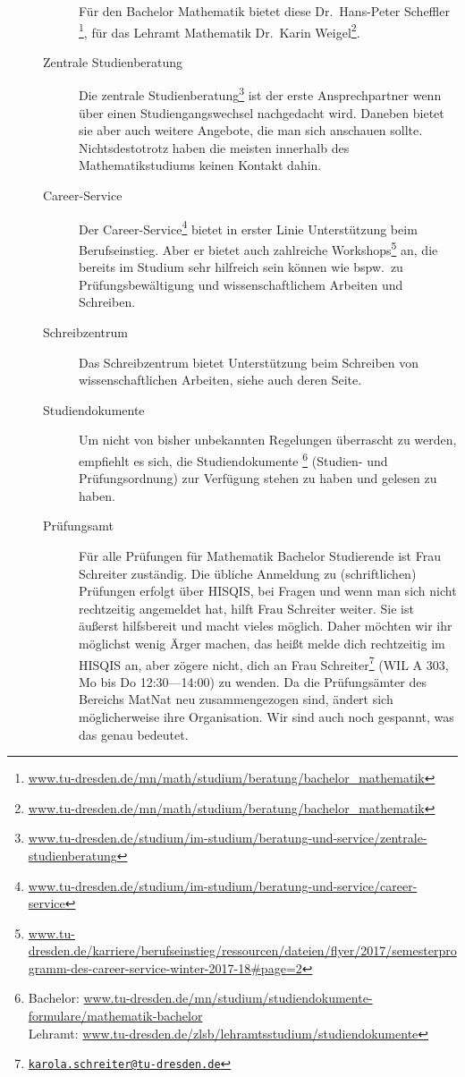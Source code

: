 \documentclass{scrartcl}
\begin{document}
\begin{description}
\begin{description}
    Für den Bachelor Mathematik bietet diese Dr.\ Hans-Peter Scheffler%
    \footnote{\url{www.tu-dresden.de/mn/math/studium/beratung/bachelor_mathematik}}, für das Lehramt Mathematik Dr.\ Karin Weigel\footnote{\url{www.tu-dresden.de/mn/math/studium/beratung/bachelor_mathematik}}.
  \item[Zentrale Studienberatung] Die zentrale Studienberatung\footnote{\url{www.tu-dresden.de/studium/im-studium/beratung-und-service/zentrale-studienberatung}} ist der erste Ansprechpartner wenn über einen Studiengangswechsel nachgedacht wird. Daneben bietet sie aber auch weitere Angebote,
    die man sich anschauen sollte.
    Nichtsdestotrotz haben die meisten innerhalb des Mathematikstudiums keinen Kontakt dahin.
  \item[Career-Service] Der Career-Service\footnote{\url{www.tu-dresden.de/studium/im-studium/beratung-und-service/career-service}} bietet in erster Linie Unterstützung beim Berufseinstieg.
    Aber er bietet auch zahlreiche Workshops\footnote{\url{www.tu-dresden.de/karriere/berufseinstieg/ressourcen/dateien/flyer/2017/semesterprogramm-des-career-service-winter-2017-18\#page=2}} an, die bereits im Studium
    sehr hilfreich sein können wie bspw.\ zu Prüfungsbewältigung und
    wissenschaftlichem Arbeiten und Schreiben.
  \item[Schreibzentrum] Das Schreibzentrum bietet Unterstützung beim Schreiben von wissenschaftlichen Arbeiten, siehe auch deren Seite.
  \item[Studiendokumente] Um nicht von bisher unbekannten Regelungen
    überrascht zu werden, empfiehlt es sich, die Studiendokumente
    \footnote{Bachelor: \url{www.tu-dresden.de/mn/studium/studiendokumente-formulare/mathematik-bachelor}\\
    Lehramt: \url{www.tu-dresden.de/zlsb/lehramtsstudium/studiendokumente}}
    (Studien- und Prüfungsordnung) zur Verfügung stehen zu haben und
    gelesen zu haben.
  \item[Prüfungsamt] Für alle Prüfungen für Mathematik Bachelor Studierende ist
    Frau Schreiter zuständig.
    Die übliche Anmeldung zu (schriftlichen) Prüfungen erfolgt über HISQIS,
    bei Fragen und wenn man sich nicht rechtzeitig angemeldet hat, hilft Frau Schreiter weiter.
    Sie ist äußerst hilfsbereit und macht vieles möglich.
    Daher möchten wir ihr möglichst wenig Ärger machen, das heißt melde dich rechtzeitig im HISQIS an,
    aber zögere nicht,
    dich an Frau Schreiter\footnote{\href{mailto:karola.schreiter@tu-dresden.de}
    {\nolinkurl{karola.schreiter@tu-dresden.de}}} (WIL A 303, Mo bis Do 12:30---14:00) zu wenden.
    Da die Prüfungsämter des Bereichs MatNat neu zusammengezogen sind, ändert sich möglicherweise ihre
    Organisation. Wir sind auch noch gespannt, was das genau bedeutet.


\end{description}
\end{description}
\end{document}
